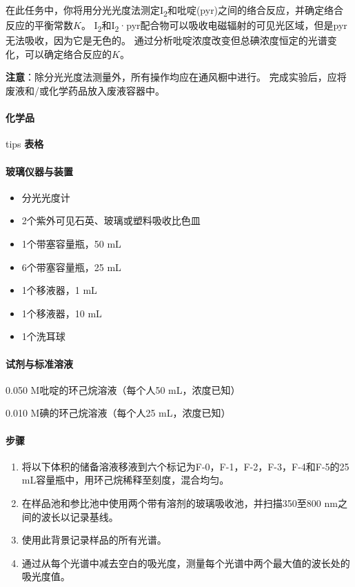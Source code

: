 在此任务中，你将用分光光度法测定I\textsubscript{2}和吡啶(pyr)之间的络合反应，并确定络合反应的平衡常数\(K\)。
I\textsubscript{2}和I\textsubscript{2}·pyr配合物可以吸收电磁辐射的可见光区域，但是pyr无法吸收，因为它是无色的。
通过分析吡啶浓度改变但总碘浓度恒定的光谱变化，可以确定络合反应的\(K\)。

\noindent\textbf{注意}：除分光光度法测量外，所有操作均应在通风橱中进行。
完成实验后，应将废液和/或化学药品放入废液容器中。

\paragraph{化学品}


tips \textbf{表格}

\paragraph{玻璃仪器与装置}

\begin{itemize}
\tightlist
\item
  分光光度计
\item
  2个紫外可见石英、玻璃或塑料吸收比色皿
\item
  1个带塞容量瓶，50 mL
\item
  6个带塞容量瓶，25 mL
\item
  1个移液器，1 mL
\item
  1个移液器，10 mL
\item
  1个洗耳球
\end{itemize}

\paragraph{试剂与标准溶液}

0.050 M吡啶的环己烷溶液（每个人50 mL，浓度已知）

0.010 M碘的环己烷溶液（每个人25 mL，浓度已知）

\paragraph{步骤}
\begin{enumerate}
\tightlist
\item
  将以下体积的储备溶液移液到六个标记为F-0，F-1，F-2，F-3，F-4和F-5的25
  mL容量瓶中，用环己烷稀释至刻度，混合均匀。
\item
  在样品池和参比池中使用两个带有溶剂的玻璃吸收池，并扫描350至800
  nm之间的波长以记录基线。
\item
  使用此背景记录样品的所有光谱。
\item
  通过从每个光谱中减去空白的吸光度，测量每个光谱中两个最大值的波长处的吸光度值。
\end{enumerate}

